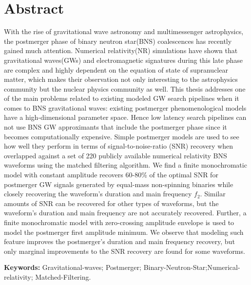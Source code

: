 \chapter*{Abstract}

With the rise of gravitational wave astronomy and multimessenger astrophysics, the postmerger phase of binary neutron star(BNS) coalescences has recently gained much attention. Numerical relativity(NR) simulations have shown that gravitational waves(GWs) and electromagnetic signatures during this late phase are complex and highly dependent on the equation of state of supranuclear matter, which makes their observation not only interesting to the astrophysics community but the nuclear physics community as well. This thesis addresses one of the main problems related to existing modeled GW search pipelines when it comes to BNS gravitational waves: existing postmerger phenomenological models have a high-dimensional parameter space. Hence low latency search pipelines can not use BNS GW approximants that include the postmerger phase since it becomes computationally expensive. Simple postmerger models are used to see how well they perform in terms of signal-to-noise-ratio (SNR) recovery when overlapped against a set of 220 publicly available numerical relativity BNS waveforms using the matched filtering algorithm. We find a finite monochromatic model with constant amplitude recovers 60-80\% of the optimal SNR for postmerger GW signals generated by equal-mass non-spinning binaries while closely recovering the waveform's duration and main frequency $f_2$. Similar amounts of SNR can be recovered for other types of waveforms, but the waveform's duration and main frequency are not accurately recovered. Further, a finite monochromatic model with zero-crossing amplitude envelope is used to model the postmerger first amplitude minimum. We observe that modeling such feature improves the postmerger's duration and main frequency recovery, but only marginal improvements to the SNR recovery are found for some waveforms.







\vspace{1cm}
\textbf{Keywords:} Gravitational-waves; Postmerger; Binary-Neutron-Star;Numerical-relativity; Matched-Filtering.

